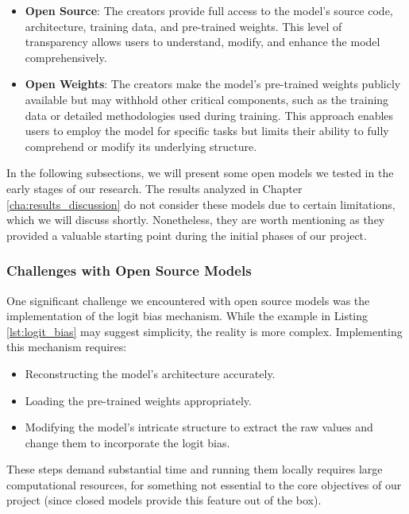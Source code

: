 \begin{itemize}
  \item \textbf{Open Source}: The creators provide full access to the model's source
    code, architecture, training data, and pre-trained weights. This level of transparency
    allows users to understand, modify, and enhance the model comprehensively.

  \item \textbf{Open Weights}: The creators make the model's pre-trained weights
    publicly available but may withhold other critical components, such as the
    training data or detailed methodologies used during training. This approach enables
    users to employ the model for specific tasks but limits their ability to fully
    comprehend or modify its underlying structure.
\end{itemize}

In the following subsections, we will present some open models we tested in the early
stages of our research. The results analyzed in Chapter
\ref{cha:results_discussion} do not consider these models due to certain
limitations, which we will discuss shortly. Nonetheless, they are worth mentioning
as they provided a valuable starting point during the initial phases of our project.

\subsubsection{Challenges with Open Source Models}

One significant challenge we encountered with open source models was the
implementation of the logit bias mechanism. While the example in Listing \ref{lst:logit_bias}
may suggest simplicity, the reality is more complex. Implementing this mechanism
requires:

\begin{itemize}
  \item Reconstructing the model's architecture accurately.

  \item Loading the pre-trained weights appropriately.

  \item Modifying the model's intricate structure to extract the raw values and change
    them to incorporate the logit bias.
\end{itemize}

These steps demand substantial time and running them locally requires large
computational resources, for something not essential to the core objectives of our
project (since closed models provide this feature out of the box).

